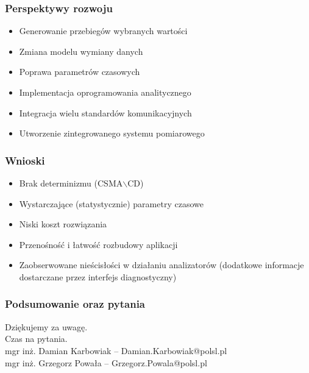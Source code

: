 \documentclass[ucs]{beamer}
\begin{document}
\begin{frame}
\frametitle{Perspektywy rozwoju}
\begin{itemize}
\setlength{\itemsep}{5pt}
\setlength{\parskip}{5pt}
\setlength{\parsep}{5pt}
\item Generowanie przebiegów wybranych wartości
\item Zmiana modelu wymiany danych
\item Poprawa parametrów czasowych
\item Implementacja oprogramowania analitycznego
\item Integracja wielu standardów komunikacyjnych
\item Utworzenie zintegrowanego systemu pomiarowego
\end{itemize}
\end{frame}

\begin{frame}
\frametitle{Wnioski}
\begin{itemize}
\setlength{\itemsep}{5pt}
\setlength{\parskip}{5pt}
\setlength{\parsep}{5pt}
\item Brak determinizmu (CSMA$\backslash$CD)
\item Wystarczające (statystycznie) parametry czasowe
\item Niski koszt rozwiązania
\item Przenośność i łatwość rozbudowy aplikacji
\item Zaobserwowane nieścisłości w działaniu analizatorów (dodatkowe informacje dostarczane przez interfejs diagnostyczny)
\end{itemize}
\end{frame}

\begin{frame}
\frametitle{Podsumowanie oraz pytania}
Dziękujemy za uwagę.
\\\vspace{2cm}
Czas na pytania.
\\\vspace{2cm}
mgr inż. Damian Karbowiak -- Damian.Karbowiak@polsl.pl
\\\vspace{2mm}
mgr inż. Grzegorz Powała  -- Grzegorz.Powala@polsl.pl
\end{frame}
\end{document}
